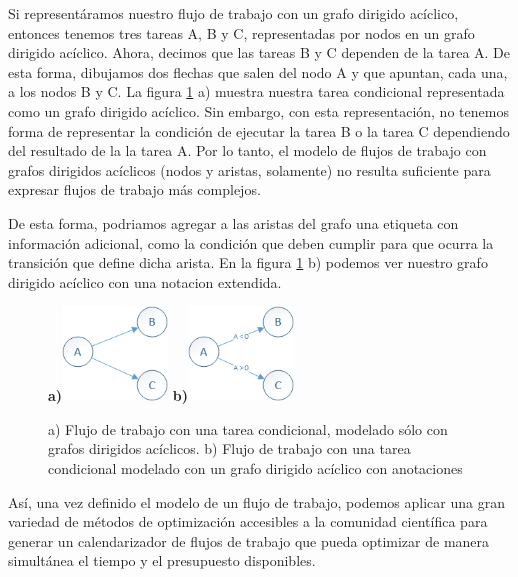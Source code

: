 \documentclass[letterpaper, 12pt]{report}
\begin{document}
Si representáramos nuestro flujo de trabajo con un grafo dirigido acíclico, entonces tenemos tres tareas A, B y C, representadas por nodos en un grafo dirigido acíclico. Ahora, decimos que las tareas B y C dependen de la tarea A. De esta forma, dibujamos dos flechas que salen del nodo A y que apuntan, cada una, a los nodos B y C. La figura  \ref{fig:conditionalTask} a) muestra nuestra tarea condicional representada como un grafo dirigido acíclico. Sin embargo, con esta representación, no tenemos forma de representar la condición de ejecutar la tarea B o la tarea C dependiendo del resultado de la la tarea A. Por lo tanto, el modelo de flujos de trabajo con grafos dirigidos acíclicos (nodos y aristas, solamente) no resulta suficiente para expresar flujos de trabajo más complejos.

De esta forma, podriamos agregar a las aristas del grafo una etiqueta con información adicional, como la condición que deben cumplir para que ocurra la transición que define dicha arista. En la figura \ref{fig:conditionalTask} b) podemos ver nuestro grafo dirigido acíclico con una notacion extendida.

\begin{figure}
    \begin{center}
        \textbf{ a)}\includegraphics[width=0.25\textwidth]{imagenes/ConditionalTask1}
        \textbf{ b)}\includegraphics[width=0.25\textwidth]{imagenes/ConditionalTask2}

    \end{center}
    \caption{a) Flujo de trabajo con una tarea condicional, modelado sólo con grafos dirigidos acíclicos.  b) Flujo de trabajo con una tarea condicional modelado con un grafo dirigido acíclico con anotaciones }
    \label{fig:conditionalTask}
\end{figure}


Así, una vez definido el modelo de un flujo de trabajo, podemos aplicar una gran variedad de métodos de optimización accesibles a la comunidad científica para generar un calendarizador de flujos de trabajo que pueda optimizar de manera simultánea el tiempo y el presupuesto disponibles.
\end{document}
